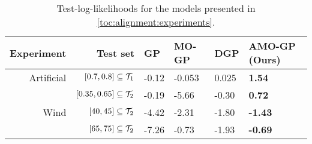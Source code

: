 \begin{table}[t]
    \centering
    \caption[Alignment experiments]{
        \label{tab:alignment:dampened_sine_model_log_likelihoods}
        Test-log-likelihoods for the models presented in \cref{toc:alignment:experiments}.
    }
    \begin{tabularx}{\linewidth}{rrYYYY}
        \toprule
        Experiment & Test set                       & GP    & MO-GP  & DGP   & AMO-GP (Ours)  \\
        \midrule
        Artificial & $[0.7, 0.8] \subseteq \mathcal{T}_1$   & -0.12 & -0.053 & 0.025 & \textbf{1.54}  \\
                   & $[0.35, 0.65] \subseteq \mathcal{T}_2$ & -0.19 & -5.66  & -0.30 & \textbf{0.72}  \\
        \midrule
        Wind       & $[40, 45] \subseteq \mathcal{T}_2 $    & -4.42 & -2.31  & -1.80 & \textbf{-1.43} \\
                   & $[65, 75] \subseteq \mathcal{T}_2 $    & -7.26 & -0.73  & -1.93 & \textbf{-0.69} \\
        \bottomrule
    \end{tabularx}
\end{table}
